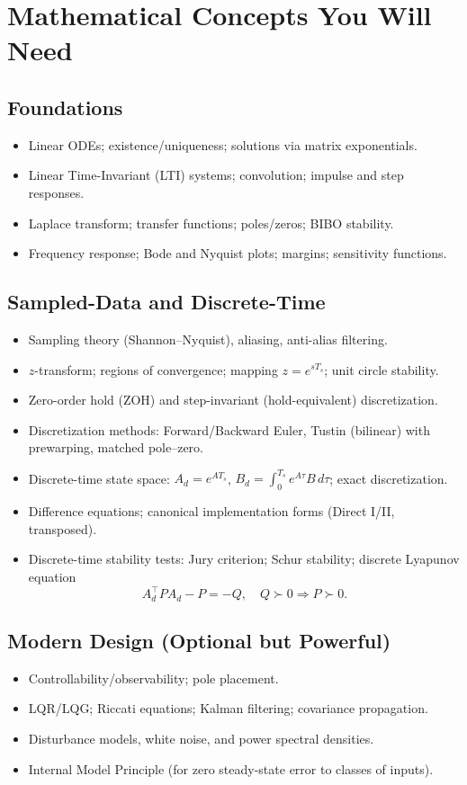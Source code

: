 \documentclass[11pt,a4paper]{article}
\begin{document}
	\section{Mathematical Concepts You Will Need}
	\subsection*{Foundations}
	\begin{itemize}
		\item Linear ODEs; existence/uniqueness; solutions via matrix exponentials.
		\item Linear Time-Invariant (LTI) systems; convolution; impulse and step responses.
		\item Laplace transform; transfer functions; poles/zeros; BIBO stability.
		\item Frequency response; Bode and Nyquist plots; margins; sensitivity functions.
	\end{itemize}
	
	\subsection*{Sampled-Data and Discrete-Time}
	\begin{itemize}
		\item Sampling theory (Shannon--Nyquist), aliasing, anti-alias filtering.
		\item $z$-transform; regions of convergence; mapping $z=e^{sT_s}$; unit circle stability.
		\item Zero-order hold (ZOH) and step-invariant (hold-equivalent) discretization.
		\item Discretization methods: Forward/Backward Euler, Tustin (bilinear) with prewarping, matched pole--zero.
		\item Discrete-time state space: $A_d=e^{AT_s}$, $B_d=\int_0^{T_s} e^{A\tau}B\,d\tau$; exact discretization.
		\item Difference equations; canonical implementation forms (Direct I/II, transposed).
		\item Discrete-time stability tests: Jury criterion; Schur stability; discrete Lyapunov equation
		$$
		A_d^\top P A_d - P = -Q,\quad Q\succ 0 \Rightarrow P\succ 0.
		$$
	\end{itemize}
	
	\subsection*{Modern Design (Optional but Powerful)}
	\begin{itemize}
		\item Controllability/observability; pole placement.
		\item LQR/LQG; Riccati equations; Kalman filtering; covariance propagation.
		\item Disturbance models, white noise, and power spectral densities.
		\item Internal Model Principle (for zero steady-state error to classes of inputs).
	\end{itemize}
	
\end{document}
